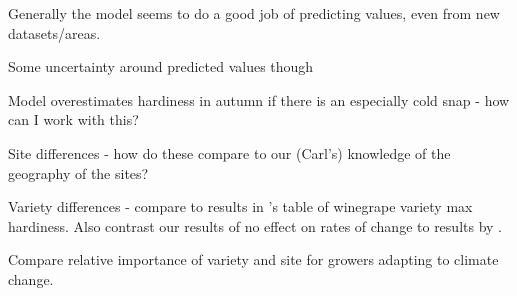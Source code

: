 \documentclass[11pt,letter]{article}
\begin{document}
Generally the model seems to do a good job of predicting values, even from new datasets/areas. 

Some uncertainty around predicted values though 

Model overestimates hardiness in autumn if there is an especially cold snap - how can I work with this?

Site differences - how do these compare to our (Carl's) knowledge of the geography of the sites?

Variety differences - compare to results in \cite{Ferguson2014}'s table of winegrape variety max hardiness. Also contrast our results of no effect on rates of change to results by \cite{Ferguson2014,Kovaleski2018a,Kovaleski2019}. 

Compare relative importance of variety and site for growers adapting to climate change. 






\end{document}
